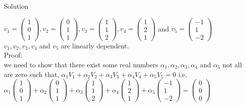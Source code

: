 \documentclass[45pt]{article}
\begin{document}
\vspace{0.4cm}

\Large{Solution}\\

\vspace{0.3cm}

$v_1=\begin{pmatrix}
    1\\0\\1
\end{pmatrix},
v_2=\begin{pmatrix}
    0\\1\\1
\end{pmatrix},
v_3=\begin{pmatrix}
    1\\1\\2
\end{pmatrix},
v_4=\begin{pmatrix}
    1\\2\\1
\end{pmatrix}$ and 
$v_5=\begin{pmatrix}
    -1\\1\\-2
\end{pmatrix}
$ \\

$v_1,v_2,v_3,v_4$ and $v_5$ are linearly dependent. \\

Proof: \\
 we need to show that there exist some real numbers $\alpha_1,\alpha_2,\alpha_3,\alpha_4$ and $\alpha_5$ not all are zero such that, 
 $\alpha_1 V_1+\alpha_2 V_2+\alpha_3 V_3+ \alpha_4 V_4+\alpha_5 V_5=0$ i.e, \\
 $\alpha_1 \begin{pmatrix}
    1\\0\\1
\end{pmatrix}
+\alpha_2 \begin{pmatrix}
    0\\1\\1
\end{pmatrix}
+\alpha_3 \begin{pmatrix}
    1\\1\\2
\end{pmatrix}
+ \alpha_4 \begin{pmatrix}
    1\\2\\1
\end{pmatrix}
+\alpha_5 \begin{pmatrix}
    -1\\1\\-2
\end{pmatrix}=\begin{pmatrix}
0\\0\\0
\end{pmatrix}$ 
 
\end{document}
